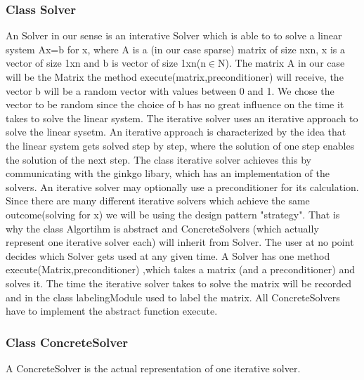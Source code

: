 \documentclass[parskip=full]{scrartcl}
\begin{document}
\subsubsection{Class Solver}
An Solver in our sense is an interative Solver which is able to to solve a linear system Ax=b for x, where A is a (in our case sparse) matrix of size nxn, x is a vector of size 1xn and b is vector of size 1xn(n$\in$N). The matrix A in our case will be the Matrix the method execute(matrix,preconditioner) will receive, the vector b will be a random vector with values between 0 and 1. We chose the vector to be random since the choice of b has no great influence on the time it takes to solve the linear system.
The \gls{iterative solver} uses an iterative approach to solve the linear sysetm. An iterative approach is characterized by the idea that the linear system gets solved step by step, where the solution of one step enables the solution of the next step. The class \gls{iterative solver} achieves this by communicating with the ginkgo libary, which has an implementation of the solvers. An \gls{iterative solver} may optionally use a \gls{preconditioner} for its calculation. Since there are many different \gls{iterative solver}s which achieve the same outcome(solving for x) we will be using the design pattern "\gls{strategy}". That is why the class Algortihm is abstract and ConcreteSolvers (which actually represent one \gls{iterative solver} each) will inherit from Solver. The user at no point decides which Solver gets used at any given time. \newline
A Solver has one method execute(Matrix,\gls{preconditioner}) ,which takes a matrix (and a \gls{preconditioner}) and solves it. The time the \gls{iterative solver} takes to solve the matrix will be recorded and in the class labelingModule used to label the matrix. All ConcreteSolvers have to implement the abstract function execute.

\subsubsection{Class ConcreteSolver}
A ConcreteSolver is the actual representation of one \gls{iterative solver}.
\end{document}
